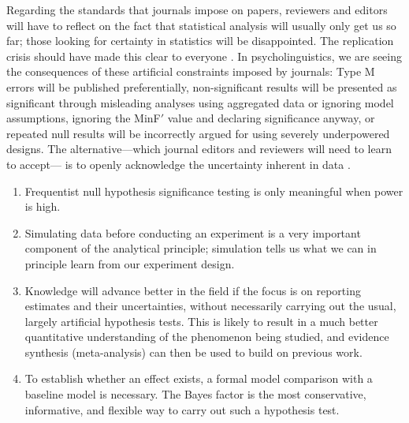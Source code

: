 \documentclass{ar-1col}\usepackage[]{graphicx}\usepackage[]{color}
\begin{document}
Regarding the standards that journals impose on papers, reviewers and editors will have to reflect on the fact that statistical analysis will usually only get us so far; those looking for certainty in statistics will be disappointed. The replication crisis should have made this clear to everyone \citep{open2015estimating}. In psycholinguistics, we are seeing the consequences of these artificial constraints imposed by journals: Type M errors will be published preferentially, non-significant results will be presented as significant through misleading analyses using aggregated data or ignoring model assumptions, ignoring the MinF$'$ value and declaring significance anyway, or repeated null results will be incorrectly argued for using severely underpowered designs.  The alternative---which journal editors and reviewers will need to learn to accept--- is to openly acknowledge the uncertainty inherent in data \citep{VasishthGelman2021}. 

\begin{summary}
\begin{enumerate}
\item Frequentist null hypothesis significance testing is only meaningful when power is high.
\item Simulating data before conducting an experiment is a very important component of the analytical principle; simulation tells us what we can in principle learn from our experiment design.
\item Knowledge will advance better in the field if the focus is on reporting estimates and their uncertainties, without necessarily carrying out the usual, largely artificial hypothesis tests. This is likely to result in a much better quantitative understanding of the phenomenon being studied, and evidence synthesis (meta-analysis) can then be used to build on previous work.
\item To establish whether an effect exists,  a formal model comparison with a baseline model is necessary. The Bayes factor is the most conservative, informative, and flexible way to carry out such a hypothesis test.
\end{enumerate}
\end{summary}
\end{document}

